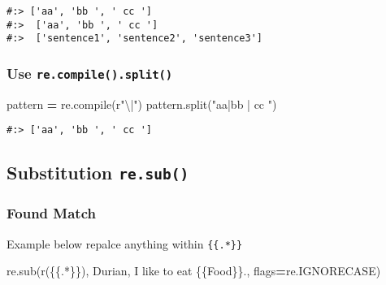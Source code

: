 \documentclass[
]{book}
\newenvironment{Shaded}{\begin{snugshade}}{\end{snugshade}}
\newcommand{\BuiltInTok}[1]{#1}
\newcommand{\NormalTok}[1]{#1}
\newcommand{\OperatorTok}[1]{\textcolor[rgb]{0.43,0.43,0.43}{\textbf{#1}}}
\newcommand{\SpecialCharTok}[1]{\textcolor[rgb]{0,0,0}{#1}}
\newcommand{\StringTok}[1]{\textcolor[rgb]{0.5,0.5,0.5}{#1}}
\newcommand{\VerbatimStringTok}[1]{\textcolor[rgb]{0.5,0.5,0.5}{#1}}
\begin{document}
\begin{verbatim}
#:> ['aa', 'bb ', ' cc '] 
#:>  ['aa', 'bb ', ' cc '] 
#:>  ['sentence1', 'sentence2', 'sentence3']
\end{verbatim}

\hypertarget{use-re.compile.split}{%
\subsubsection{\texorpdfstring{Use \texttt{re.compile().split()}}{Use re.compile().split()}}\label{use-re.compile.split}}

\begin{Shaded}
\begin{Highlighting}[]
\NormalTok{pattern }\OperatorTok{=}\NormalTok{ re.}\BuiltInTok{compile}\NormalTok{(}\VerbatimStringTok{r"\textbackslash{}|"}\NormalTok{)}
\NormalTok{pattern.split(}\StringTok{"aa|bb | cc "}\NormalTok{)}
\end{Highlighting}
\end{Shaded}

\begin{verbatim}
#:> ['aa', 'bb ', ' cc ']
\end{verbatim}

\hypertarget{substitution-re.sub}{%
\subsection{\texorpdfstring{Substitution \texttt{re.sub()}}{Substitution re.sub()}}\label{substitution-re.sub}}

\hypertarget{found-match}{%
\subsubsection{Found Match}\label{found-match}}

Example below repalce anything within \texttt{\{\{.*\}\}}

\begin{Shaded}
\begin{Highlighting}[]
\NormalTok{re.sub(}\VerbatimStringTok{r\textquotesingle{}(}\SpecialCharTok{\{\{}\VerbatimStringTok{.*}\SpecialCharTok{\}\}}\VerbatimStringTok{)\textquotesingle{}}\NormalTok{, }\StringTok{\textquotesingle{}Durian\textquotesingle{}}\NormalTok{, }\StringTok{\textquotesingle{}I like to eat }\SpecialCharTok{\{\{}\StringTok{Food}\SpecialCharTok{\}\}}\StringTok{.\textquotesingle{}}\NormalTok{, flags}\OperatorTok{=}\NormalTok{re.IGNORECASE)}
\end{Highlighting}
\end{Shaded}
\end{document}
